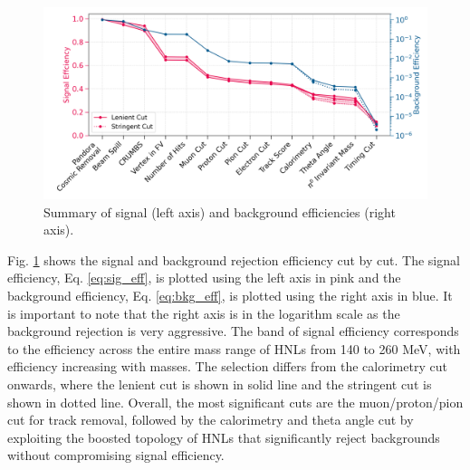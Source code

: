 \begin{figure}[htbp!]
    \centering 
    \includegraphics[width=1.0\textwidth]{peff_band}
    \caption[Summar of Selection Efficiency.]{
		Summary of signal (left axis) and background efficiencies (right axis).
	}
        \label{fig:eff}
\end{figure}

Fig. \ref{fig:eff} shows the signal and background rejection efficiency cut by cut.
The signal efficiency, Eq. \ref{eq:sig_eff}, is plotted using the left axis in pink and the background efficiency, Eq. \ref{eq:bkg_eff}, is plotted using the right axis in blue.
It is important to note that the right axis is in the logarithm scale as the background rejection is very aggressive.
The band of signal efficiency corresponds to the efficiency across the entire mass range of HNLs from 140 to 260 MeV, with efficiency increasing with masses. 
The selection differs from the calorimetry cut onwards, where the lenient cut is shown in solid line and the stringent cut is shown in dotted line.
Overall, the most significant cuts are the muon/proton/pion cut for track removal, followed by the calorimetry and theta angle cut by exploiting the boosted topology of HNLs that significantly reject backgrounds without compromising signal efficiency.

